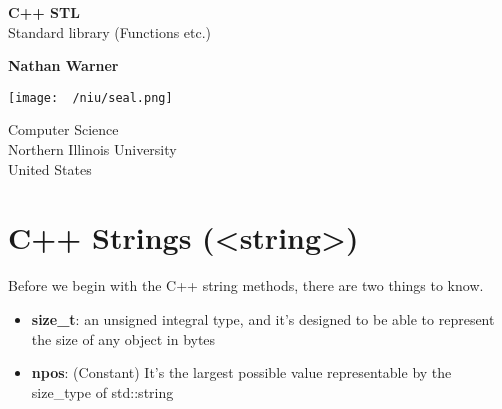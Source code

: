 \documentclass{report}
\title{\Huge{}}
\author{\huge{Nathan Warner}}
\date{\huge{}}
\begin{document}
        \begin{titlepage}
       \begin{center}
           \vspace*{1cm}
    
           \textbf{C++ STL} \\
           Standard library (Functions etc.)
    
           \vspace{0.5cm}
            
                
           \vspace{1.5cm}
    
           \textbf{Nathan Warner}
    
           \vfill
                
                
           \vspace{0.8cm}
         
           \texttt{[image: ~/niu/seal.png]}
                
           Computer Science \\
           Northern Illinois University\\
           United States\\
           
                
       \end{center}
    \end{titlepage}
    \tableofcontents
    \pagebreak \bigbreak \noindent
    \section{\LARGE C++ Strings (<string>)}
    \bigbreak \noindent 
    \begin{interlude}
       Before we begin with the C++ string methods, there are two things to know.
       \begin{itemize}
           \item \textbf{size\_t}: an unsigned integral type, and it's designed to be able to represent the size of any object in bytes
            \item \textbf{npos}: (Constant) It's the largest possible value representable by the size\_type of std::string
       \end{itemize}
    \end{interlude}
    \bigbreak \noindent 
    
\end{document}
